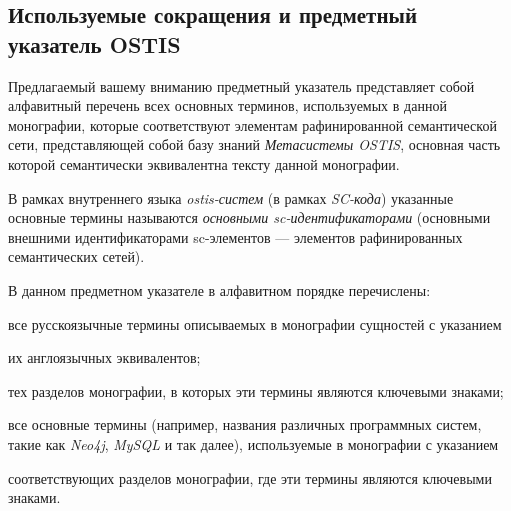 \begin{partbacktext}
\part*{Используемые сокращения и предметный указатель OSTIS}
\label{part_glossary}

Предлагаемый вашему вниманию предметный указатель представляет собой алфавитный перечень всех основных терминов, используемых в данной монографии, которые  соответствуют элементам рафинированной семантической сети, представляющей собой базу знаний \textit{Метасистемы OSTIS}, основная часть которой семантически эквивалентна тексту данной монографии.

В рамках внутреннего языка \textit{ostis-систем} (в рамках \textit{SC-кода}) указанные основные термины называются \textit{основными sc-идентификаторами} (основными внешними идентификаторами sc-элементов --- элементов рафинированных семантических сетей).


В данном предметном указателе в алфавитном порядке перечислены:
\begin{textitemize}
	\item все русскоязычные  термины описываемых в монографии сущностей с указанием
	\begin{textitemize}
		\item их англоязычных эквивалентов;
		\item тех разделов монографии, в которых эти термины являются ключевыми знаками;
	\end{textitemize}
	\item все  основные термины (например, названия различных программных систем, такие как \textit{Neo4j}, \textit{MySQL} и так далее), используемые в монографии с указанием
	\begin{textitemize}
		\item соответствующих разделов монографии, где эти термины являются ключевыми знаками.
	\end{textitemize}
\end{textitemize}


\end{partbacktext}
